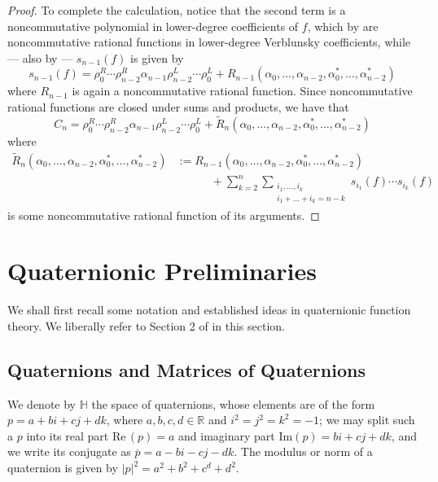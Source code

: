 \documentclass[11pt,reqno]{amsart}
\def\a{\alpha}
\def\r{\rho}
\def\RR{\mathbb{R}}
\def\HH{\mathbb{H}}
\theoremstyle{definition}
\numberwithin{equation}{section}
\renewcommand{\tilde}{\widetilde}
\renewcommand{\Re}{\mathrm{Re}\,}
\renewcommand{\Im}{\mathrm{Im}}
\begin{document}
\begin{proof}
    To complete the calculation, notice that the second term is a noncommutative polynomial in lower-degree coefficients of \(f\), which by  are noncommutative rational functions in lower-degree Verblunsky coefficients, while --- also by  --- \(s_{n-1}(f)\) is given by
    \[
        s_{n-1}(f) = \r_0^R \cdots \r_{n-2}^R \a_{n-1} \r_{n-2}^L \cdots \r_0^L + R_{n-1}(\a_0, \ldots, \a_{n-2}, \a_0^*, \ldots, \a_{n-2}^*)
    \]
    where \(R_{n-1}\) is again a noncommutative rational function. Since noncommutative rational functions are closed under sums and products, we have that
    \begin{equation}
	\label{eq:VerForm}
        C_{n} = \r_0^R \cdots \r_{n-2}^R \a_{n-1} \r_{n-2}^L \cdots \r_0^L + \tilde{R}_{n}(\a_0, \ldots, \a_{n-2}, \a_0^*, \ldots, \a_{n-2}^*)
    \end{equation}
    where
    \begin{align*}
        \tilde{R}_n(\a_0, \ldots, \a_{n-2}, \a_0^*, \ldots, \a_{n-2}^*) & := R_{n-1}(\a_0, \ldots, \a_{n-2}, \a_0^*, \ldots, \a_{n-2}^*) \\ & \quad \quad \quad + \sum_{k=2}^n \sum_{\substack{i_1, \ldots, i_k \\ i_1 + \ldots + i_k = n-k}} s_{i_1}(f) \cdots s_{i_k}(f)
    \end{align*}
    is some noncommutative rational function of its arguments.
\end{proof}

\section{Quaternionic Preliminaries}

We shall first recall some notation and established ideas in quaternionic function theory. We liberally refer to Section 2 of \cite{ACKS15} in this section.

\subsection{Quaternions and Matrices of Quaternions} We denote by \(\HH\) the space of quaternions, whose elements are of the form \(p = a + bi + cj + dk\), where \(a,b,c,d \in \RR\) and \(i^2 = j^2 = k^2 = -1\); we may split such a \(p\) into its real part \(\Re(p) = a\) and imaginary part \(\Im(p) = bi + cj + dk\), and we write its conjugate as \(\overline{p} = a - bi - cj - dk\). The modulus or norm of a quaternion is given by \(\lvert p \rvert^2 = a^2 + b^2 + c^d + d^2\).
\end{document}
